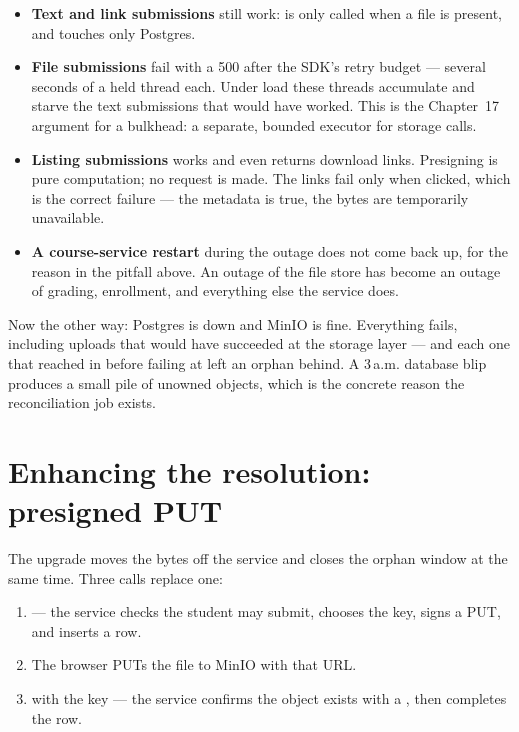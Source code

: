 \begin{itemize}
  \item \textbf{Text and link submissions} still work:  is
  only called when a file is present, and  touches only
  Postgres.
  \item \textbf{File submissions} fail with a 500 after the SDK's retry
  budget --- several seconds of a held thread each. Under load these
  threads accumulate and starve the text submissions that would have
  worked. This is the Chapter~17 argument for a bulkhead: a separate,
  bounded executor for storage calls.
  \item \textbf{Listing submissions} works and even returns download
  links. Presigning is pure computation; no request is made. The links
  fail only when clicked, which is the correct failure --- the metadata
  is true, the bytes are temporarily unavailable.
  \item \textbf{A course-service restart} during the outage does not
  come back up, for the reason in the pitfall above. An outage of the
  file store has become an outage of grading, enrollment, and everything
  else the service does.
\end{itemize}

Now the other way: Postgres is down and MinIO is fine. Everything fails,
including uploads that would have succeeded at the storage layer ---
and each one that reached  in  before failing at
 left an orphan behind. A 3\,a.m. database blip produces a small
pile of unowned objects, which is the concrete reason the reconciliation
job exists.

\section{Enhancing the resolution: presigned PUT}
\label{sec:presigned-put}

The upgrade moves the bytes off the service and closes the orphan
window at the same time. Three calls replace one:

\begin{enumerate}
  \item {} --- the
  service checks the student may submit, chooses the key, signs a PUT,
  and inserts a  row.
  \item The browser PUTs the file to MinIO with that URL.
  \item {} with the key --- the
  service confirms the object exists with a , then completes
  the row.
\end{enumerate}

